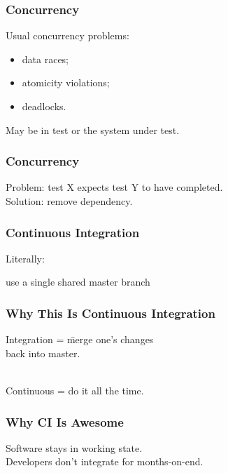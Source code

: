 \documentclass{beamer}
\newenvironment{changemargin}[1]{%
  \begin{list}{}{%
    \setlength{\topsep}{0pt}%
    \setlength{\leftmargin}{#1}%
    \setlength{\rightmargin}{1em}
    \setlength{\listparindent}{\parindent}%
    \setlength{\itemindent}{\parindent}%
    \setlength{\parsep}{\parskip}%
  }%
  \item[]}{\end{list}}
\begin{document}
\begin{frame}
  \frametitle{Concurrency}
  \Large
  \begin{changemargin}{1cm}
    Usual concurrency problems:
    \begin{itemize}
    \item data races;
    \item atomicity violations;
    \item deadlocks.
    \end{itemize}
    May be in test or the system under test.
  \end{changemargin}
\end{frame}

\begin{frame}
  \frametitle{Concurrency}
  \Large
  \begin{changemargin}{1cm}
    Problem: test X expects test Y to have completed.\\
    Solution: remove dependency.
  \end{changemargin}
\end{frame}

\begin{frame}
  \frametitle{Continuous Integration}

  \Large
  \begin{changemargin}{2cm}
    Literally:
  \end{changemargin}
    \begin{center}
      use a single shared master branch
    \end{center}
\end{frame}

\begin{frame}
  \frametitle{Why This Is Continuous Integration}

  \Large
  \begin{changemargin}{2cm}
    \begin{tabbing}
    Integration = \= merge one's changes \\
    \> back into master.
    \end{tabbing}
    ~\\
    Continuous = do it all the time.
  \end{changemargin}
\end{frame}

\begin{frame}
  \frametitle{Why CI Is Awesome}

  \Large
  \begin{changemargin}{1cm}
    Software stays in working state.\\[1em]
    Developers don't integrate for months-on-end.
  \end{changemargin}
\end{frame}
\end{document}
